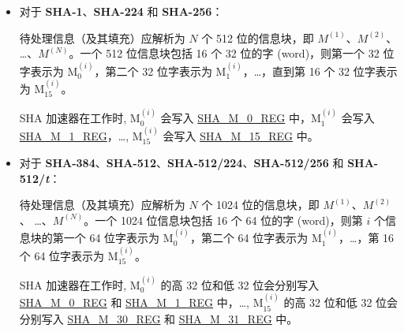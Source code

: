 \documentclass[main\_\_CN.tex]{subfiles}
\begin{document}
\begin{itemize}
    \item 对于 \textbf{SHA-1}、\textbf{SHA-224} 和 \textbf{SHA-256}：

    待处理信息（及其填充）应解析为 \begin{math}N\end{math} 个 512 位的信息块，即 \begin{math}M^{(1)}\end{math}、\begin{math}M^{(2)}\end{math}、 \dots、\begin{math}M^{(N)}\end{math}。一个 512 位信息块包括 16 个 32 位的字 (word)，则第一个 32 位字表示为 M$^{(i)}_{0}$，第二个 32 位字表示为 M$^{(i)}_{1}$，\dots，直到第 16 个 32 位字表示为 M$^{(i)}_{15}$。

    SHA 加速器在工作时, M$^{(i)}_{0}$ 会写入 \hyperref[regdesc:SHAMNREG]{SHA\_M\_0\_REG} 中，M$^{(i)}_1$ 会写入 \hyperref[regdesc:SHAMNREG]{SHA\_M\_1\_REG}，\dots, M$^{(i)}_{15}$ 会写入 \hyperref[regdesc:SHAMNREG]{SHA\_M\_15\_REG} 中。

    \item 对于 \textbf{SHA-384}、\textbf{SHA-512}、\textbf{SHA-512/224}、\textbf{SHA-512/256} 和 \textbf{SHA-512/\it{t}}：

    待处理信息（及其填充）应解析为 \begin{math}N\end{math} 个 1024 位的信息块，即 \begin{math}M^{(1)}\end{math}、\begin{math}M^{(2)}\end{math}、 \dots、\begin{math}M^{(N)}\end{math}。一个 1024 位信息块包括 16 个 64 位的字 (word)，则第 \begin{math}i\end{math} 个信息块的第一个 64 位字表示为 M$^{(i)}_{0}$，第二个 64 位字表示为 M$^{(i)}_{1}$，\dots，第 16 个 64 位字表示为 M$^{(i)}_{15}$。

    SHA 加速器在工作时, M$^{(i)}_{0}$ 的高 32 位和低 32 位会分别写入 \hyperref[regdesc:SHAMNREG]{SHA\_M\_0\_REG} 和 \hyperref[regdesc:SHAMNREG]{SHA\_M\_1\_REG} 中，\dots, M$^{(i)}_{15}$ 的高 32 位和低 32 位会分别写入 \hyperref[regdesc:SHAMNREG]{SHA\_M\_30\_REG} 和 \hyperref[regdesc:SHAMNREG]{SHA\_M\_31\_REG} 中。

\end{itemize}
\end{document}
